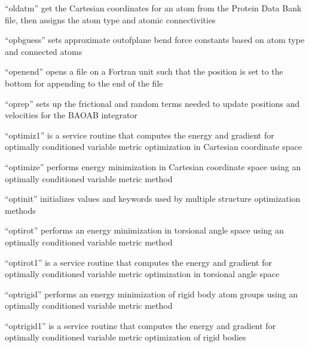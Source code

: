 \documentclass[letterpaper,11pt,english]{sphinxmanual}
\begin{document}
“oldatm” get the Cartesian coordinates for an atom from
the Protein Data Bank file, then assigns the atom type
and atomic connectivities


“opbguess” sets approximate out\sphinxhyphen{}of\sphinxhyphen{}plane bend force constants
based on atom type and connected atoms


“openend” opens a file on a Fortran unit such that the position
is set to the bottom for appending to the end of the file


“oprep” sets up the frictional and random terms needed to
update positions and velocities for the BAOAB integrator



“optimiz1” is a service routine that computes the energy and
gradient for optimally conditioned variable metric optimization
in Cartesian coordinate space


“optimize” performs energy minimization in Cartesian coordinate
space using an optimally conditioned variable metric method


“optinit” initializes values and keywords used by multiple
structure optimization methods


“optirot” performs an energy minimization in torsional angle
space using an optimally conditioned variable metric method


“optirot1” is a service routine that computes the energy and
gradient for optimally conditioned variable metric optimization
in torsional angle space


“optrigid” performs an energy minimization of rigid body atom
groups using an optimally conditioned variable metric method


“optrigid1” is a service routine that computes the energy
and gradient for optimally conditioned variable metric
optimization of rigid bodies
\end{document}
